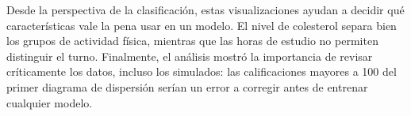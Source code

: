 \documentclass[11pt,letterpaper]{article}
\begin{document}
Desde la perspectiva de la clasificación, estas visualizaciones ayudan a decidir qué características vale la pena usar en un modelo. El nivel de colesterol separa bien los grupos de actividad física, mientras que las horas de estudio no permiten distinguir el turno. Finalmente, el análisis mostró la importancia de revisar críticamente los datos, incluso los simulados: las calificaciones mayores a 100 del primer diagrama de dispersión serían un error a corregir antes de entrenar cualquier modelo.

\end{document}

